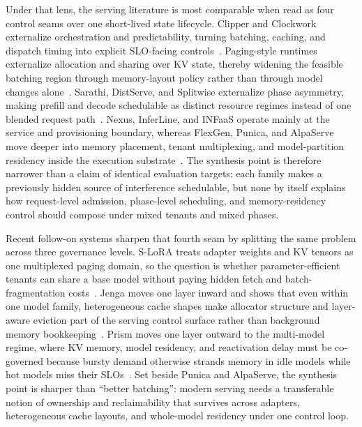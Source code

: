 \documentclass[acmsmall,screen,review]{acmart}
\begin{document}
Under that lens, the serving literature is most comparable when read as four control seams over one short-lived state lifecycle. Clipper and Clockwork externalize orchestration and predictability, turning batching, caching, and dispatch timing into explicit SLO-facing controls~\cite{crankshaw2017clipper,gujarati2020clockwork}. Paging-style runtimes externalize allocation and sharing over KV state, thereby widening the feasible batching region through memory-layout policy rather than through model changes alone~\cite{kwon2023pagedattention}. Sarathi, DistServe, and Splitwise externalize phase asymmetry, making prefill and decode schedulable as distinct resource regimes instead of one blended request path~\cite{agrawal2024sarathi,zhong2024distserve,patel2024splitwise}. Nexus, InferLine, and INFaaS operate mainly at the service and provisioning boundary, whereas FlexGen, Punica, and AlpaServe move deeper into memory placement, tenant multiplexing, and model-partition residency inside the execution substrate~\cite{shen2019nexus,crankshaw2020inferline,romero2021infaas,sheng2023flexgen,chen2024punica,li2023alpaserve}. The synthesis point is therefore narrower than a claim of identical evaluation targets: each family makes a previously hidden source of interference schedulable, but none by itself explains how request-level admission, phase-level scheduling, and memory-residency control should compose under mixed tenants and mixed phases.

Recent follow-on systems sharpen that fourth seam by splitting the same problem across three governance levels. S-LoRA treats adapter weights and KV tensors as one multiplexed paging domain, so the question is whether parameter-efficient tenants can share a base model without paying hidden fetch and batch-fragmentation costs~\cite{sheng2023slora}. Jenga moves one layer inward and shows that even within one model family, heterogeneous cache shapes make allocator structure and layer-aware eviction part of the serving control surface rather than background memory bookkeeping~\cite{zhang2025jenga}. Prism moves one layer outward to the multi-model regime, where KV memory, model residency, and reactivation delay must be co-governed because bursty demand otherwise strands memory in idle models while hot models miss their SLOs~\cite{yu2025prism}. Set beside Punica and AlpaServe, the synthesis point is sharper than ``better batching'': modern serving needs a transferable notion of ownership and reclaimability that survives across adapters, heterogeneous cache layouts, and whole-model residency under one control loop.
\end{document}

